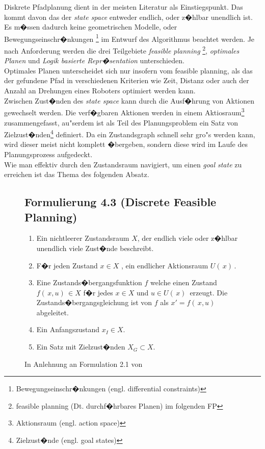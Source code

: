 Diskrete Pfadplanung dient in der meisten Literatur als Einstiegspunkt. Das kommt davon das der \textit{state space} entweder endlich, oder z�hlbar unendlich ist.\\
Es m�ssen dadurch keine geometrischen Modelle, oder Bewegungseinschr�nkungen \footnote{Bewegungseinschr�nkungen (engl. differential constraints)} im Entwurf des Algorithmus beachtet werden.
Je nach Anforderung werden die drei Teilgebiete \textit{feasible planning} \footnote{feasible planning (Dt. durchf�hrbares Planen) im folgenden FP}, \textit{optimales Planen} und \textit{Logik basierte Repr�sentation} unterschieden.\cite[~S. 27]{Lav06}\\
Optimales Planen unterscheidet sich nur insofern vom feasible planning, als das der gefundene Pfad in verschiedenen Kriterien wie Zeit, Distanz oder auch der Anzahl an Drehungen eines Roboters optimiert werden kann.\cite[~S. 43]{Lav06} \\
Zwischen Zust�nden des \textit{state space} kann durch die Ausf�hrung von Aktionen gewechselt werden. Die verf�gbaren Aktionen werden in einem Aktiosraum\footnote{Aktionsraum (engl. action space) } zusammengefasst, au"serdem ist als Teil des Planungsproblem ein Satz von Zielzust�nden\footnote{Zielzust�nde (engl. goal states)} definiert. 
Da ein Zustandsgraph schnell sehr gro"s werden kann, wird dieser meist nicht komplett �bergeben, sondern diese wird im Laufe des Planungsprozess aufgedeckt.
\cite[~S. 43]{Lav06} \\
Wie man effektiv durch den Zustandsraum navigiert, um einen \textit{goal state} zu erreichen ist das Thema des folgenden Absatz.
\begin{figure}
\centering
\subsection*{Formulierung 4.3 (Discrete Feasible Planning)}
\begin{enumerate}
	\item Ein nichtleerer Zustandsraum $X$, der endlich viele oder z�hlbar unendlich viele Zust�nde beschreibt.  
	\item F�r jeden Zustand $x \in X$ , ein endlicher Aktionsraum $U( \, x) \,$.
	\item Eine Zustands�bergangsfunktion $f$ welche einen Zustand  $f( \, x,u) \, \in X$ f�r jedes $x \in X$  und $u \in U( \, x) \,$ erzeugt. Die Zustands�bergangsgleichung ist von $f$ als $x' = f( \, x,u )\, $ abgeleitet.
	\item Ein Anfangszustand $ x_{I} \in X$.
	\item Ein Satz mit Zielzust�nden $X_{G} \subset X$.
\end{enumerate}
\caption{In Anlehnung an Formulation 2.1 von \cite[~S. 29]{Lav06}}
\label{lav03}
\end{figure}
